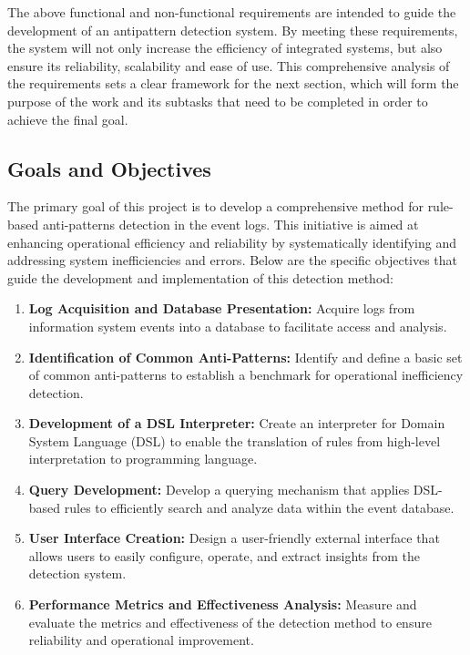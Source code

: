 \documentclass[12pt, times]{article}
\begin{document}
\hspace*{5mm}The above functional and non-functional requirements are intended to guide the development of an antipattern detection system. By meeting these requirements, the system will not only increase the efficiency of integrated systems, but also ensure its reliability, scalability and ease of use. This comprehensive analysis of the requirements sets a clear framework for the next section, which will form the purpose of the work and its subtasks that need to be completed in order to achieve the final goal.

\subsection{Goals and Objectives}

\hspace*{5mm}The primary goal of this project is to develop a comprehensive method for rule-based anti-patterns detection in the event logs. This initiative is aimed at enhancing operational efficiency and reliability by systematically identifying and addressing system inefficiencies and errors. Below are the specific objectives that guide the development and implementation of this detection method:

\begin{enumerate}
	\item \textbf{Log Acquisition and Database Presentation:} Acquire logs from information system events into a database to facilitate access and analysis.
	\item \textbf{Identification of Common Anti-Patterns:} Identify and define a basic set of common anti-patterns to establish a benchmark for operational inefficiency detection.
	\item \textbf{Development of a DSL Interpreter:} Create an interpreter \cite{interpreter} for Domain System Language (DSL) to enable the translation of rules from high-level interpretation to programming language.
	\item \textbf{Query Development:} Develop a querying mechanism that applies DSL-based rules to efficiently search and analyze data within the event database.
	\item \textbf{User Interface Creation:} Design a user-friendly external interface that allows users to easily configure, operate, and extract insights from the detection system.
	\item \textbf{Performance Metrics and Effectiveness Analysis:} Measure and evaluate the metrics and effectiveness of the detection method to ensure reliability and operational improvement.
\end{enumerate}
\end{document}
